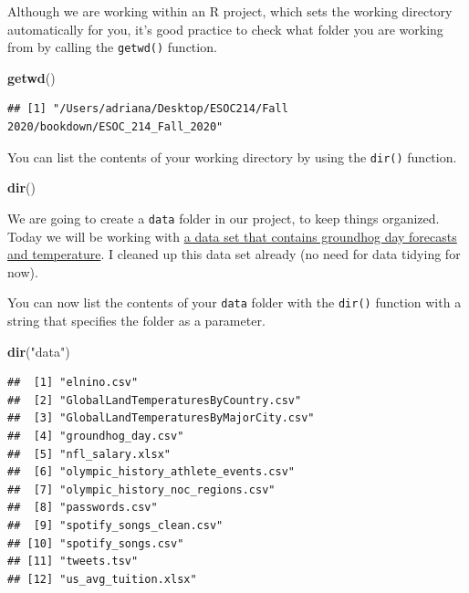 \documentclass[
]{book}
\newenvironment{Shaded}{\begin{snugshade}}{\end{snugshade}}
\newcommand{\KeywordTok}[1]{\textcolor[rgb]{0.13,0.29,0.53}{\textbf{#1}}}
\newcommand{\NormalTok}[1]{#1}
\newcommand{\StringTok}[1]{\textcolor[rgb]{0.31,0.60,0.02}{#1}}
\begin{document}
Although we are working within an R project, which sets the working directory automatically for you, it's good practice to check what folder you are working from by calling the \texttt{getwd()} function.

\begin{Shaded}
\begin{Highlighting}[]
\KeywordTok{getwd}\NormalTok{()}
\end{Highlighting}
\end{Shaded}

\begin{verbatim}
## [1] "/Users/adriana/Desktop/ESOC214/Fall 2020/bookdown/ESOC_214_Fall_2020"
\end{verbatim}

You can list the contents of your working directory by using the \texttt{dir()} function.

\begin{Shaded}
\begin{Highlighting}[]
\KeywordTok{dir}\NormalTok{()}
\end{Highlighting}
\end{Shaded}

We are going to create a \texttt{data} folder in our project, to keep things organized. Today we will be working with \href{https://www.kaggle.com/groundhogclub/groundhog-day}{a data set that contains groundhog day forecasts and temperature}. I cleaned up this data set already (no need for data tidying for now).

You can now list the contents of your \texttt{data} folder with the \texttt{dir()} function with a string that specifies the folder as a parameter.

\begin{Shaded}
\begin{Highlighting}[]
\KeywordTok{dir}\NormalTok{(}\StringTok{"data"}\NormalTok{)}
\end{Highlighting}
\end{Shaded}

\begin{verbatim}
##  [1] "elnino.csv"                           
##  [2] "GlobalLandTemperaturesByCountry.csv"  
##  [3] "GlobalLandTemperaturesByMajorCity.csv"
##  [4] "groundhog_day.csv"                    
##  [5] "nfl_salary.xlsx"                      
##  [6] "olympic_history_athlete_events.csv"   
##  [7] "olympic_history_noc_regions.csv"      
##  [8] "passwords.csv"                        
##  [9] "spotify_songs_clean.csv"              
## [10] "spotify_songs.csv"                    
## [11] "tweets.tsv"                           
## [12] "us_avg_tuition.xlsx"
\end{verbatim}
\end{document}
